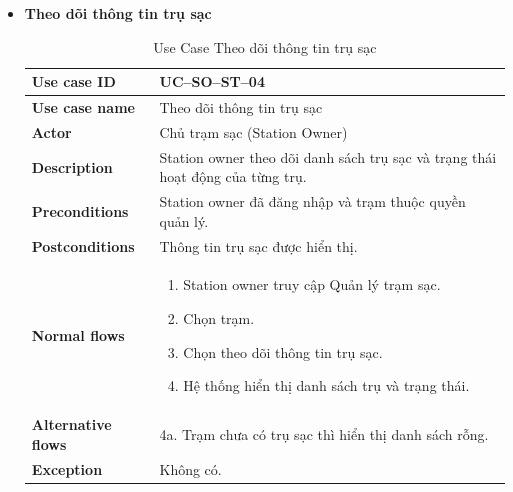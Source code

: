 \begin{enumerate}[label=\textbf{\alph*)}]
\begin{itemize}
  \item \textbf{Theo dõi thông tin trụ sạc}
    \begin{center}
      \renewcommand{\arraystretch}{1.5}
      \begin{longtable}{|m{}|m{}|}
          \caption{Use Case Theo dõi thông tin trụ sạc}
        \label{tab:uc_so_st_04} \\
        \hline
        \textbf{Use case ID} & UC--SO--ST--04 \\
        \hline
        \textbf{Use case name} & Theo dõi thông tin trụ sạc \\
        \hline
        \textbf{Actor} & Chủ trạm sạc (Station Owner) \\
        \hline
        \textbf{Description} & Station owner theo dõi danh sách trụ sạc và trạng thái hoạt động của từng trụ. \\
        \hline
        \textbf{Preconditions} &
        Station owner đã đăng nhập và trạm thuộc quyền quản lý.\\
        \hline
        \textbf{Postconditions} &
        Thông tin trụ sạc được hiển thị.\\
        \hline
        \textbf{Normal flows} &
        \begin{enumerate}[label=\arabic*.]
          \item Station owner truy cập Quản lý trạm sạc.
          \item Chọn trạm.
          \item Chọn theo dõi thông tin trụ sạc.
          \item Hệ thống hiển thị danh sách trụ và trạng thái.
        \end{enumerate}\\
        \hline
        \textbf{Alternative flows} &
        4a. Trạm chưa có trụ sạc thì hiển thị danh sách rỗng.\\
        \hline
        \textbf{Exception} &
        Không có.\\
        \hline
        \end{longtable}
    \end{center}


\end{itemize}
\end{enumerate}
